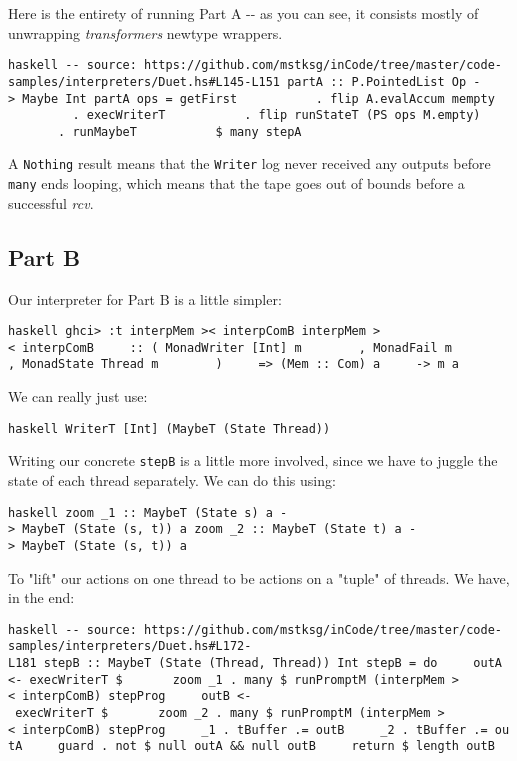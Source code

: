 \documentclass[]{article}
\begin{document}
Here is the entirety of running Part A -\/- as you can see, it consists mostly
of unwrapping \emph{transformers} newtype wrappers.

\texttt{haskell\ -\/-\ source:\ https://github.com/mstksg/inCode/tree/master/code-samples/interpreters/Duet.hs\#L145-L151\ partA\ ::\ P.PointedList\ Op\ -\textgreater{}\ Maybe\ Int\ partA\ ops\ =\ getFirst\ \ \ \ \ \ \ \ \ \ \ .\ flip\ A.evalAccum\ mempty\ \ \ \ \ \ \ \ \ \ \ .\ execWriterT\ \ \ \ \ \ \ \ \ \ \ .\ flip\ runStateT\ (PS\ ops\ M.empty)\ \ \ \ \ \ \ \ \ \ \ .\ runMaybeT\ \ \ \ \ \ \ \ \ \ \ \$\ many\ stepA}

A \texttt{Nothing} result means that the \texttt{Writer} log never received any
outputs before \texttt{many} ends looping, which means that the tape goes out of
bounds before a successful \emph{rcv}.

\subsection{Part B}

Our interpreter for Part B is a little simpler:

\texttt{haskell\ ghci\textgreater{}\ :t\ interpMem\ \textgreater{}\textbar{}\textless{}\ interpComB\ interpMem\ \textgreater{}\textbar{}\textless{}\ interpComB\ \ \ \ \ ::\ (\ MonadWriter\ {[}Int{]}\ m\ \ \ \ \ \ \ \ ,\ MonadFail\ m\ \ \ \ \ \ \ \ ,\ MonadState\ Thread\ m\ \ \ \ \ \ \ \ )\ \ \ \ \ =\textgreater{}\ (Mem\ :\textbar{}:\ Com)\ a\ \ \ \ \ -\textgreater{}\ m\ a}

We can really just use:

\texttt{haskell\ WriterT\ {[}Int{]}\ (MaybeT\ (State\ Thread))}

Writing our concrete \texttt{stepB} is a little more involved, since we have to
juggle the state of each thread separately. We can do this using:

\texttt{haskell\ zoom\ \_1\ ::\ MaybeT\ (State\ s)\ a\ -\textgreater{}\ MaybeT\ (State\ (s,\ t))\ a\ zoom\ \_2\ ::\ MaybeT\ (State\ t)\ a\ -\textgreater{}\ MaybeT\ (State\ (s,\ t))\ a}

To "lift" our actions on one thread to be actions on a "tuple" of threads. We
have, in the end:

\texttt{haskell\ -\/-\ source:\ https://github.com/mstksg/inCode/tree/master/code-samples/interpreters/Duet.hs\#L172-L181\ stepB\ ::\ MaybeT\ (State\ (Thread,\ Thread))\ Int\ stepB\ =\ do\ \ \ \ \ outA\ \textless{}-\ execWriterT\ \$\ \ \ \ \ \ \ zoom\ \_1\ .\ many\ \$\ runPromptM\ (interpMem\ \textgreater{}\textbar{}\textless{}\ interpComB)\ stepProg\ \ \ \ \ outB\ \textless{}-\ execWriterT\ \$\ \ \ \ \ \ \ zoom\ \_2\ .\ many\ \$\ runPromptM\ (interpMem\ \textgreater{}\textbar{}\textless{}\ interpComB)\ stepProg\ \ \ \ \ \_1\ .\ tBuffer\ .=\ outB\ \ \ \ \ \_2\ .\ tBuffer\ .=\ outA\ \ \ \ \ guard\ .\ not\ \$\ null\ outA\ \&\&\ null\ outB\ \ \ \ \ return\ \$\ length\ outB}
\end{document}
